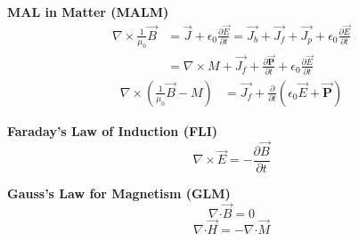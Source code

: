 \documentclass[12pt]{article}
\newcommand{\dotP}{\boldsymbol \cdot}		%
\begin{document}
\begin{minipage}[t]{0.35\textwidth}
	\textbf{MAL in Matter (MALM)}
	\begin{align*}
		\nabla \times \frac{1}{\mu_0} \vec{B} &= \vec{J} + \epsilon_0 \frac{\partial \vec{E}}{\partial t}
			= \vec{J_b} + \vec{J_f} + \vec{J_p} + \epsilon_0 \frac{\partial \vec{E}}{\partial t} \\
		&= \nabla \times M + \vec{J_f} + \frac{\partial \vec{ \mathbf{P} }}{\partial t} 
			+ \epsilon_0 \frac{\partial \vec{E}}{\partial t}
	\end{align*}
	\begin{align*}
		\nabla \times \left( \frac{1}{\mu_0} \vec{B} - M \right)
			&= \vec{J_f} + \frac{\partial}{\partial t} \left( \epsilon_0 \vec{E} + \vec{ \mathbf{P} } \right)
	\end{align*}

	\vspace{10pt}
\end{minipage}

\vspace{20pt}
\begin{center}
\begin{minipage}[t]{0.35\textwidth}
	\textbf{Faraday's Law of Induction (FLI)}
	\[ \boxed{ \nabla \times \vec{E} = -\frac{\partial \vec{B}}{\partial t} } \]
	\hfill \break 
\end{minipage} 
\hspace{0.15\textwidth} 
\begin{minipage}[t]{0.35\textwidth}
	\textbf{Gauss's Law for Magnetism (GLM)}
	\[ \boxed{ \nabla \dotP \vec{B} = 0 } \]
	\[ \boxed{ \nabla \dotP \vec{H} = - \nabla \dotP \vec{M} } \]
\end{minipage} 
\end{center}
\end{document}
